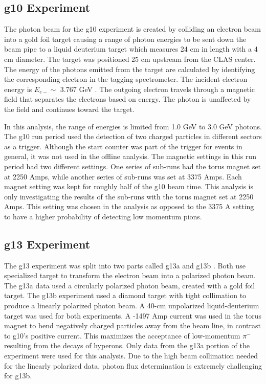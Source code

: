 \documentclass[prb,10pt,twocolumn,tightenlines,superscriptaddress]{revtex4-1}
\begin{document}
\subsection{g10 Experiment}
The photon beam for the g10 experiment is created by colliding an electron beam into a gold foil target causing a range of photon energies to be sent down the beam pipe to a liquid deuterium target which measures 24 cm in length with a 4 cm diameter. The target was positioned 25 cm upstream from the CLAS center. The energy of the photons emitted from the target are calculated by identifying the corresponding electron in the tagging spectrometer. The incident electron energy is $E_{e−} \sim$ 3.767 GeV . The outgoing electron travels through a magnetic field that separates the electrons based on energy. The photon is unaffected by the field and continues toward the target. 

In this analysis, the range of energies is limited from 1.0 GeV to 3.0 GeV photons.
The g10 run period used the detection of two charged particles in different sectors as a trigger. Although the start counter was part of the trigger for events in general, it was not used in the offline analysis. The magnetic settings in this run period had two different settings. One series of sub-runs had the torus magnet set at 2250 Amps, while another series of sub-runs was set at 3375 Amps\cite{bib:ref5b}. Each magnet setting was kept for roughly half of the g10 beam time. This analysis is only investigating the results of the sub-runs with the torus magnet set at 2250 Amps. This setting was chosen in the analysis as opposed to the 3375 A setting to have a higher probability of detecting low momentum pions.

\subsection{g13 Experiment}
The g13 experiment was split into two parts called g13a and g13b \cite{bib:ref6}. Both use specialized target to transform the electron beam into a polarized photon beam. The g13a data used a circularly polarized photon beam, created with a gold foil target.  The g13b experiment used a diamond target with tight collimation to produce a linearly polarized photon beam. A 40-cm unpolarized liquid-deuterium target was used for both experiments. A -1497 Amp current was used in the torus magnet to bend negatively charged particles away from the beam line, in contrast to g10's positive current. This maximizes the acceptance of low-momentum $\pi^{-}$ resulting from the decays of hyperons. Only data from the g13a portion of the experiment were used for this analysis. Due to the high beam collimation needed for the linearly polarized data, photon flux determination is extremely challenging for g13b.
\end{document}
